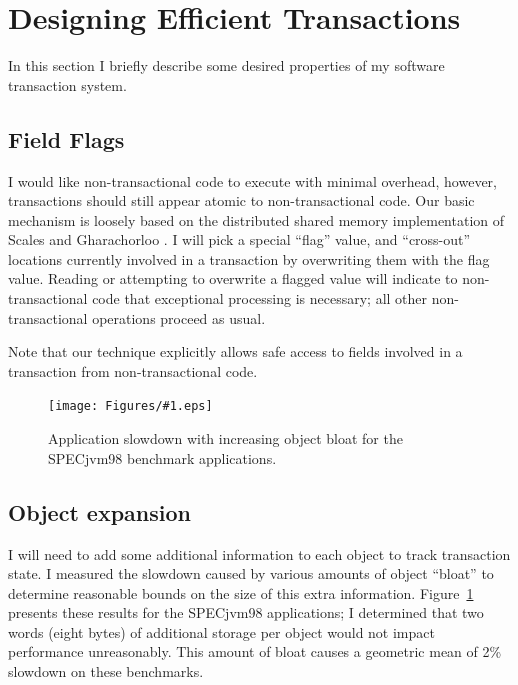 \documentclass[12pt,oneside]{article}
\newcommand{\note}[1]{}%
\newcommand{\punt}[1]{}%
\newcommand{\epsfigput}[2]{%
\begin{figure}[t]%
\begin{center}%
\texttt{[image: Figures/\#1.eps]}%
\end{center}%
\caption{#2}%
\label{fig:#1}%
\end{figure}%
}
\newcommand{\secput}[2]{\section{#2}\label{sec:#1}}
\newcommand{\figref}[1]         {Figure~\ref{fig:#1}}
\begin{document}
\secput{efficient}{Designing Efficient Transactions}
In this section I briefly describe some desired properties of my
software transaction system.

\subsection{Field Flags}\label{sec:flagfield}
\note{Missing: performance numbers for adding check.  Use ``no trans''
version of transaction app and add check into the access functions.}
I would like non-transactional code to execute with minimal overhead,
however, transactions should still appear atomic to non-transactional
code.  Our basic mechanism is loosely based on the
distributed shared memory implementation of Scales and Gharachorloo
\cite{ScalesGh97}.  I will pick a special ``flag'' value, and
``cross-out'' locations currently involved in a transaction by
overwriting them with the flag value.  Reading or attempting to
overwrite a flagged value will indicate to non-transactional code
that exceptional processing is necessary; all other non-transactional
operations proceed as usual.

Note that our technique explicitly allows safe access to fields
involved in a transaction from non-transactional code.
\punt{
Ensuring that transactional updates remain atomic to non-transactional
code eases ``transactification'' and 
Key idea is to allow safe access by non-transactional code, so as to
allow transactification.
}

\epsfigput{bloat}{Application slowdown with increasing object bloat
for the SPECjvm98 benchmark applications.}
\subsection{Object expansion}
I will need to add some additional information to each object to
track transaction state.  I measured the slowdown caused by various
amounts of object ``bloat'' to determine reasonable bounds on the
size of this extra information.  \figref{bloat} presents these
results for the SPECjvm98 applications; I determined that two words
(eight bytes) of additional storage per object would not impact
performance unreasonably.  This amount of bloat causes a geometric
mean of 2\% slowdown on these benchmarks.
\end{document}
